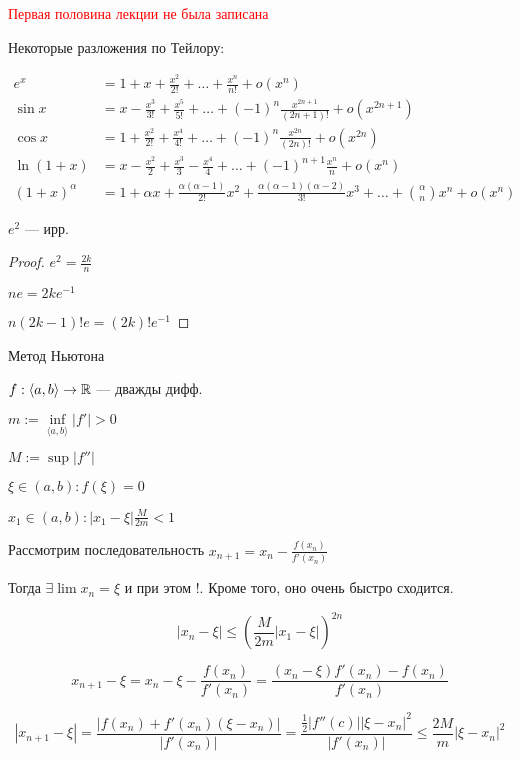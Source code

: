 

\cfoot{}

\usepackage{xcolor}


\textcolor{red}{Первая половина лекции не была записана}

Некоторые разложения по Тейлору:

$$\begin{aligned}
e^x&=1+x+\frac{x^2}{2!}+\ldots+\frac{x^n}{n!} + o(x^n) \\
\sin x &= x-\frac{x^3}{3!}+\frac{x^5}{5!}+\ldots+(-1)^n\frac{x^{2n+1}}{(2n+1)!}+o(x^{2n+1}) \\
\cos x &= 1+\frac{x^2}{2!}+\frac{x^4}{4!}+\ldots+(-1)^n\frac{x^{2n}}{(2n)!}+o(x^{2n}) \\
\ln (1+x) &= x-\frac{x^2}{2}+\frac{x^3}{3}-\frac{x^4}{4}+\ldots+(-1)^{n+1}\frac{x^n}{n}+o(x^n) \\
(1+x)^\alpha &= 1+\alpha x + \frac{\alpha(\alpha-1)}{2!}x^2+\frac{\alpha(\alpha-1)(\alpha-2)}{3!}x^3+\ldots+\binom{\alpha}{n}x^n+o(x^n)
\end{aligned}$$
\begin{lemma}
    $e^2$ --- ирр.
\end{lemma}
\begin{proof}
    $e^2=\frac{2k}{n}$

    $ne=2ke^{-1}$

    $n(2k-1)!e=(2k)!e^{-1}$
\end{proof}
\begin{lemma}
    Метод Ньютона

    $f:\langle a,b\rangle \to\operatorname*{\mathbb{R}}$ --- дважды дифф.

    $m:=\inf\limits_{\langle a,b\rangle}|f'|>0$

    $M:=\sup|f''|$
    
    $\xi \in(a,b):f(\xi)=0$

    $x_1\in(a,b) : |x_1-\xi|\frac{M}{2m}<1$

    Рассмотрим последовательность $x_{n+1}=x_n-\frac{f(x_n)}{f'(x_n)}$

    Тогда $\exists \lim x_n=\xi$ и при этом !. Кроме того, оно очень быстро сходится.

    $$|x_n-\xi|\leq \left(\frac{M}{2m}|x_1-\xi|\right)^{2n}$$
\end{lemma}

$$x_{n+1}-\xi=x_n-\xi-\frac{f(x_n)}{f'(x_n)}=\frac{(x_n-\xi)f'(x_n)-f(x_n)}{f'(x_n)}$$

$$|x_{n+1}-\xi|=\frac{|f(x_n)+f'(x_n)(\xi-x_n)|}{|f'(x_n)|}=\frac{\frac{1}{2}|f''(c)||\xi-x_n|^2}{|f'(x_n)|}\leq \frac{2M}{m}|\xi-x_n|^2$$

